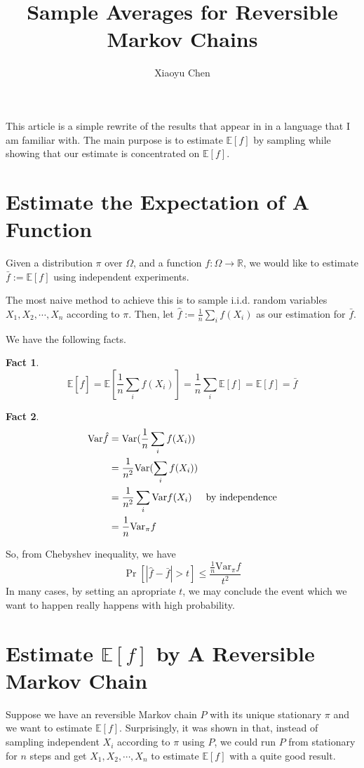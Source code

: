 \documentclass{article}
\title{Sample Averages for Reversible Markov Chains}
\author{Xiaoyu Chen}
\date{}
\newtheorem{fact}{Fact}[section]
\begin{document}
\maketitle
This article is a simple rewrite of the results that appear in \cite{aldous1987markov} in a language that I am familiar with.
The main purpose is to estimate $\mathbb{E}[f]$ by sampling while showing that our estimate is concentrated on $\mathbb{E}[f]$.

\section{Estimate the Expectation of A Function}
Given a distribution $\pi$ over $\Omega$, and a function $f: \Omega \to \mathbb{R}$, we would like to estimate $\bar{f} := \mathbb{E}[f]$ using independent experiments.

The most naive method to achieve this is to sample i.i.d. random variables $X_1, X_2, \cdots, X_n$ according to $\pi$.
Then, let $\hat{f} := \frac{1}{n}\sum_i f(X_i)$ as our estimation for $\bar{f}$.

We have the following facts.

\begin{fact}
  \[\mathbb{E}[\hat{f}] = \mathbb{E}[\frac{1}{n}\sum_i f(X_i)] = \frac{1}{n}\sum_i \mathbb{E}[f] = \mathbb{E}[f] = \bar{f}\]
\end{fact}

\begin{fact}
  \begin{align*}
    \mathrm{Var} \hat{f}
    &= \mathrm{Var} (\frac{1}{n} \sum_i f(X_i)) \\
    &= \frac{1}{n^2} \mathrm{Var} (\sum_i f(X_i)) \\
    &= \frac{1}{n^2} \sum_i \mathrm{Var} f(X_i) \hspace{0.5cm} \mbox{by independence}\\
    &= \frac{1}{n} \mathrm{Var}_\pi f
  \end{align*}
\end{fact}

So, from Chebyshev inequality, we have
\[\Pr[|\hat{f} - \bar{f}| > t] \leq \frac{\frac{1}{n} \mathrm{Var}_\pi f}{t^2}\]
In many cases, by setting an apropriate $t$, we may conclude the event which we want to happen really happens with high probability.

\section{Estimate $\mathbb{E}[f]$ by A Reversible Markov Chain}
Suppose we have an reversible Markov chain $P$ with its unique stationary $\pi$ and we want to estimate $\mathbb{E}[f]$.
Surprisingly, it was shown in \cite{aldous1987markov} that, instead of sampling independent $X_i$ according to $\pi$ using $P$, we could run $P$ from stationary for $n$ steps and get $X_1, X_2, \cdots, X_n$ to estimate $\mathbb{E}[f]$ with a quite good result.
\end{document}
